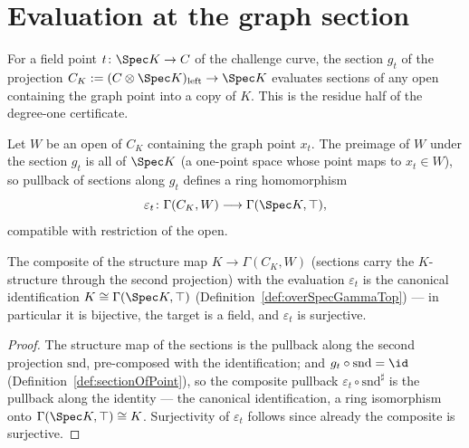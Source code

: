 \section{Evaluation at the graph section}
\label{sec:graphSectionEval}

For a field point \(t \colon \Spec K \to C\) of the challenge curve, the section
\(g_t\) of the projection \(C_K := (C \otimes \Spec K)_{\mathrm{left}} \to \Spec K\)
evaluates sections of any open containing the graph point into a copy of \(K\). This is
the residue half of the degree-one certificate.

\begin{definition}
  \label{def:graphSectionEval}
  \leanok
  Let \(W\) be an open of \(C_K\) containing the graph point \(x_t\). The preimage of
  \(W\) under the section \(g_t\) is all of \(\Spec K\) (a one-point space whose point maps
  to \(x_t \in W\)), so pullback of sections along \(g_t\) defines a ring homomorphism
  \[
    \varepsilon_t \colon \Gamma(C_K, W) \longrightarrow \Gamma(\Spec K, \top),
  \]
  compatible with restriction of the open.
\end{definition}

\begin{theorem}
  \label{thm:graphSectionEval_algebraMap}
  \leanok
  The composite of the structure map \(K \to \Gamma(C_K, W)\) (sections carry the
  \(K\)-structure through the second projection) with the evaluation \(\varepsilon_t\) is
  the canonical identification \(K \cong \Gamma(\Spec K, \top)\)
  (Definition~\ref{def:overSpecGammaTop}) — in particular it is bijective, the target is a
  field, and \(\varepsilon_t\) is surjective.
\end{theorem}
\begin{proof}
  \leanok
  The structure map of the sections is the pullback along the second projection
  \(\mathrm{snd}\), pre-composed with the identification; and
  \(g_t \circ \mathrm{snd} = \id\) (Definition~\ref{def:sectionOfPoint}), so the composite
  pullback \(\varepsilon_t \circ \mathrm{snd}^{\sharp}\) is the pullback along the
  identity — the canonical identification, a ring isomorphism onto
  \(\Gamma(\Spec K, \top) \cong K\). Surjectivity of \(\varepsilon_t\) follows since
  already the composite is surjective.
\end{proof}

